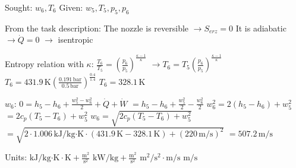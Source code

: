 Sought: \( w_6, T_6 \)  
Given: \( w_5, T_5, p_5, p_6 \)  

From the task description:  
The nozzle is reversible \( \rightarrow S_{erz} = 0 \)  
It is adiabatic \( \rightarrow \dot{Q} = 0 \)  
\( \rightarrow \) isentropic  

Entropy relation with \( \kappa \):  
\( \frac{T_6}{T_5} = \left( \frac{p_6}{p_5} \right)^{\frac{\kappa - 1}{\kappa}} \)  
\( \rightarrow T_6 = T_5 \left( \frac{p_6}{p_5} \right)^{\frac{\kappa - 1}{\kappa}} \)  
\( T_6 = 431.9 \, \text{K} \left( \frac{0.191 \, \text{bar}}{0.5 \, \text{bar}} \right)^{\frac{0.4}{1.4}} \)  
\( T_6 = 328.1 \, \text{K} \)  

\( w_6 \):  
\( 0 = h_5 - h_6 + \frac{w_5^2 - w_6^2}{2} + \dot{Q} + \dot{W} \)  
\( = h_5 - h_6 + \frac{w_5^2}{2} - \frac{w_6^2}{2} \)  
\( w_6^2 = 2(h_5 - h_6) + w_5^2 \)  
\( = 2c_p(T_5 - T_6) + w_5^2 \)  
\( w_6 = \sqrt{2c_p(T_5 - T_6) + w_5^2} \)  
\( = \sqrt{2 \cdot 1.006 \, \text{kJ/kg·K} \cdot (431.9 \, \text{K} - 328.1 \, \text{K}) + (220 \, \text{m/s})^2} \)  
\( = 507.2 \, \text{m/s} \)  

Units:  
\( \text{kJ/kg·K} \cdot \text{K} + \frac{\text{m}^2}{\text{s}^2} \)  
\( \text{kW/kg} + \frac{\text{m}^2}{\text{s}^2} \)  
\( \text{m}^2/\text{s}^2 \cdot \text{m/s} \)  
\( \text{m/s} \)